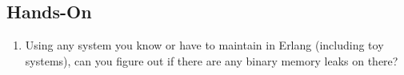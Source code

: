 \documentclass[11pt, oneside]{book}   	%
\begin{document}
\subsection{Hands-On}

\begin{enumerate}
	\item Using any system you know or have to maintain in Erlang (including toy systems), can you figure out if there are any binary memory leaks on there?
\end{enumerate}
	

\end{document}
